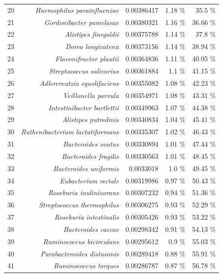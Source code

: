 \documentclass{article}
\begin{document}
\begin{table}[h]
\begin{centering}
\begin{tabular}{|r|r|r|r|r|}
      20 & \textit{Haemophilus parainfluenzae} & 0.00386417 & 1.18 \% & 35.5 \% \\
      21 & \textit{Gordonibacter pamelaeae} & 0.00380321 & 1.16 \% & 36.66 \% \\
      22 & \textit{Alistipes finegoldii} & 0.00375788 & 1.14 \% & 37.8 \% \\
      23 & \textit{Dorea longicatena} & 0.00373156 & 1.14 \% & 38.94 \% \\
      24 & \textit{Flavonifractor plautii} & 0.00364836 & 1.11 \% & 40.05 \% \\
      25 & \textit{Streptococcus salivarius} & 0.00361884 & 1.1 \% & 41.15 \% \\
      26 & \textit{Adlercreutzia equolifaciens} & 0.00355082 & 1.08 \% & 42.23 \% \\
      27 & \textit{Veillonella parvula} & 0.00354971 & 1.08 \% & 43.31 \% \\
      28 & \textit{Intestinibacter bartlettii} & 0.00349963 & 1.07 \% & 44.38 \% \\
      29 & \textit{Alistipes putredinis} & 0.00340834 & 1.04 \% & 45.41 \% \\
      30 & \textit{Ruthenibacterium lactatiformans} & 0.00335307 & 1.02 \% & 46.43 \% \\
      31 & \textit{Bacteroides ovatus} & 0.00330894 & 1.01 \% & 47.44 \% \\
      32 & \textit{Bacteroides fragilis} & 0.00330563 & 1.01 \% & 48.45 \% \\
      33 & \textit{Bacteroides uniformis} & 0.0033018 & 1.0 \% & 49.45 \% \\
      34 & \textit{Eubacterium rectale} & 0.00319986 & 0.97 \% & 50.43 \% \\
      35 & \textit{Roseburia inulinivorans} & 0.00307232 & 0.94 \% & 51.36 \% \\
      36 & \textit{Streptococcus thermophilus} & 0.00306275 & 0.93 \% & 52.29 \% \\
      37 & \textit{Roseburia intestinalis} & 0.00305426 & 0.93 \% & 53.22 \% \\
      38 & \textit{Bacteroides caccae} & 0.00298342 & 0.91 \% & 54.13 \% \\
      39 & \textit{Ruminococcus bicirculans} & 0.00295612 & 0.9 \% & 55.03 \% \\
      40 & \textit{Parabacteroides distasonis} & 0.00289418 & 0.88 \% & 55.91 \% \\
      41 & \textit{Ruminococcus torques} & 0.00286787 & 0.87 \% & 56.78 \% \\

\end{tabular}
\end{centering}
\end{table}
\end{document}
